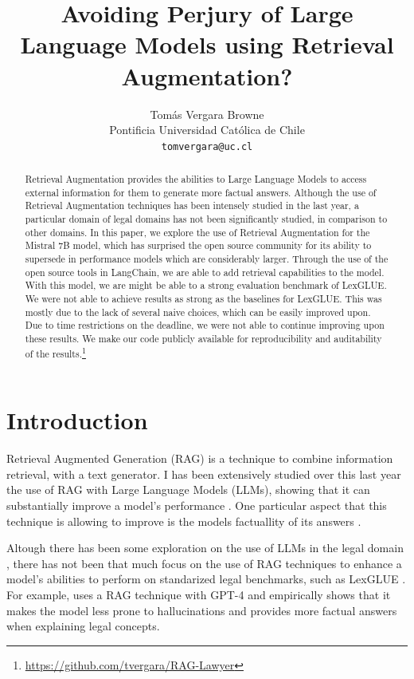 \documentclass[11pt]{article}
\title{Avoiding Perjury of Large Language Models using Retrieval Augmentation?}
\author{Tomás Vergara Browne \\
  Pontificia Universidad Católica de Chile \\
  \texttt{tomvergara@uc.cl} \\}
\begin{document}
\maketitle
\begin{abstract}
  Retrieval Augmentation provides the abilities to Large Language Models to access external information for them to generate more factual answers. Although the use of Retrieval Augmentation techniques has been intensely studied in the last year, a particular domain of legal domains has not been significantly studied, in comparison to other domains. In this paper, we explore the use of Retrieval Augmentation for the Mistral 7B model, which has surprised the open source community for its ability to supersede in performance models which are considerably larger. Through the use of the open source tools in LangChain, we are able to add retrieval capabilities to the model. With this model, we are might be able to a strong evaluation benchmark of LexGLUE. We were not able to achieve results as strong as the baselines for LexGLUE. This was mostly due to the lack of several naive choices, which can be easily improved upon. Due to time restrictions on the deadline, we were not able to continue improving upon these results. We make our code publicly available for reproducibility and auditability of the results.\footnote{\href{https://github.com/tvergara/RAG-Lawyer}{https://github.com/tvergara/RAG-Lawyer}}
\end{abstract}

\section{Introduction}
Retrieval Augmented Generation (RAG) is a technique to combine information retrieval, with a text generator. I has been extensively studied over this last year the use of RAG with Large Language Models (LLMs), showing that it can substantially improve a model's performance \cite{ram2023context}. One particular aspect that this technique is allowing to improve is the models factuallity of its answers \cite{lewis2020retrieval}.

Altough there has been some exploration on the use of LLMs in the legal domain \cite{chalkidis2020legal}, there has not been that much focus on the use of RAG techniques to enhance a model's abilities to perform on standarized legal benchmarks, such as LexGLUE \cite{chalkidis-etal-2022-lexglue}. For example, \cite{savelka2023explaining} uses a RAG technique with GPT-4 and empirically shows that it makes the model less prone to hallucinations and provides more factual answers when explaining legal concepts.
\end{document}
